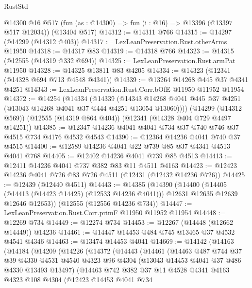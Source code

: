 \begin{lexlean}{RustStd}
\begin{coremodule}
    @14300
    @16
    @517
    (fun (as : @14300) => fun (i : @16) => @13396 (@13397 @517 @12034))
    (@13404 @517)
@14312 := @14311 @766
@14315 := @14297 (@14299 (@14312 @403))
@14317 := LexLeanPreservation.Rust.otherArms @11950
@14318 := @14317 @83
@14319 := @14318 @766
@14323 := @14315 (@12555 (@14319 @332 @694))
@14325 := LexLeanPreservation.Rust.armPat @11950
@14328 := @14325 @13811 @83 @4205
@14334 := @14323 (@12341 (@14328 @694 @713 @4548 @4341))
@14339 := @13264 @14268 @445 @37 @4341 @4251
@14343 := LexLeanPreservation.Rust.Corr.bOfE @11950 @11952 @11954
@14372 := @14254
    (@14334
      (@14339
        (@14343 @14268 @4041 @445 @37 @4251 (@13043 @14268 @4041 @37 @444 @4251 @13054 @13060))))
    (@14299 (@14312 @569))
    (@12555 (@14319 @864 @404))
    (@12341 (@14328 @404 @729 @4497 @14251))
@14385 := @12347 @14236 @4041 @4041 @734 @37 @740 @746 @37 @4515 @734 @4176 @4532 @4543
@14390 := @12364 @14236 @4041 @740 @37 @4515
@14400 := @12589 @14236 @4041 @22 @739 @85 @37 @4341 @4513 @4041 @768
@14405 := @12402 @14236 @4041 @739 @85 @4513
@14413 := @12411 @14236 @4041 @737 @382 @83 @11 @4511 @4163
@14423 := @12423 @14236 @4041 @726 @83 @726 @4511 (@12431 (@12432 @14236 @726))
@14425 := @12439 (@12440 @4511)
@14443 := @14385
    (@14390
      (@14400
        (@14405 (@14413 (@14423 @14425) (@12533 @14236 @4041)))
        @12631
        @12635
        @12639
        @12646
        @12653))
    (@12555 (@12556 @14236 @734))
@14447 := LexLeanPreservation.Rust.Corr.primF @11950 @11952 @11954
@14448 := @12269 @734
@14449 := @12274 @734
@14453 := @12267 (@14448 (@12662 @14449)) @14236
@14461 := @14447 @14453 @484 @745 @13465 @37 @4532 @4541 @4346
@14463 := @13474 @14453 @4041
@14669 := @14142
    (@14163
      (@14184
        (@14209
          (@14226
            (@14372
              (@14443
                (@14461
                  (@14463
                    @487
                    @744
                    @37
                    @39
                    @4330
                    @4531
                    @4540
                    @4323
                    @96
                    @4304
                    (@13043 @14453 @4041 @37 @486 @4330 @13493 @13497)
                    (@14463
                      @742
                      @382
                      @37
                      @11
                      @4528
                      @4341
                      @4163
                      @4323
                      @108
                      @4304
                      (@12423
                        @14453
                        @4041
                        @734

\end{coremodule}
\end{lexlean}
